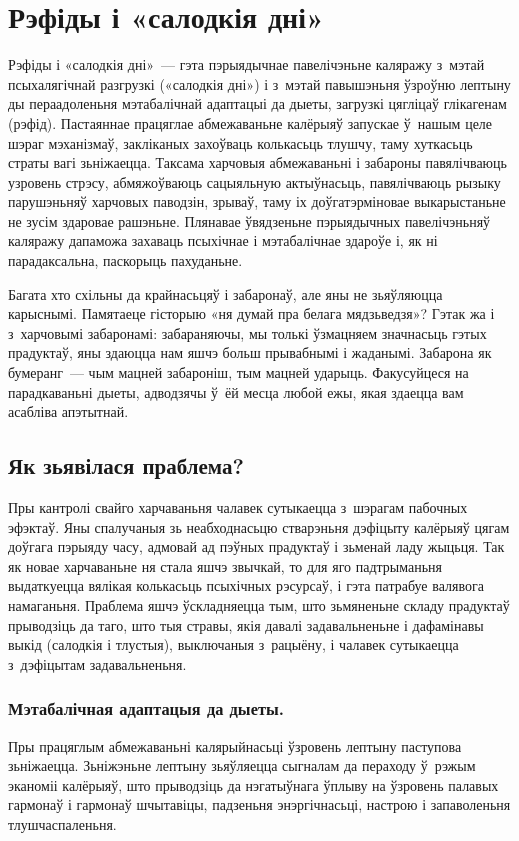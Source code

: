 \chapter{Рэфіды і «салодкія дні»}

Рэфіды і «салодкія дні»~--- гэта пэрыядычнае павелічэньне каляражу з~мэтай псыхалягічнай разгрузкі («салодкія дні») і з~мэтай павышэньня ўзроўню лептыну ды пераадоленьня мэтабалічнай адаптацыі да дыеты, загрузкі цягліцаў глікагенам (рэфід). Пастаяннае працяглае абмежаваньне калёрыяў запускае ў~нашым целе шэраг мэханізмаў, закліканых захоўваць колькасьць тлушчу, таму хуткасьць страты вагі зьніжаецца. Таксама харчовыя абмежаваньні і забароны павялічваюць узровень стрэсу, абмяжоўваюць сацыяльную актыўнасьць, павялічваюць рызыку парушэньняў харчовых паводзін, зрываў, таму іх доўгатэрміновае выкарыстаньне не зусім здаровае рашэньне. Плянавае ўвядзеньне пэрыядычных павелічэньняў каляражу дапаможа захаваць псыхічнае і мэтабалічнае здароўе і, як ні парадаксальна, паскорыць пахуданьне.

Багата хто схільны да крайнасьцяў і забаронаў, але яны не зьяўляюцца карыснымі. Памятаеце гісторыю «ня думай пра белага мядзьведзя»? Гэтак жа і з~харчовымі забаронамі: забараняючы, мы толькі ўзмацняем значнасьць гэтых прадуктаў, яны здаюцца нам яшчэ больш прывабнымі і жаданымі. Забарона як бумеранг~--- чым мацней забароніш, тым мацней ударыць. Факусуйцеся на парадкаваньні дыеты, адводзячы ў~ёй месца любой ежы, якая здаецца вам асабліва апэтытнай.

\section{Як зьявілася праблема?}

Пры кантролі свайго харчаваньня чалавек сутыкаецца з~шэрагам пабочных эфэктаў. Яны спалучаныя зь неабходнасьцю стварэньня дэфіцыту калёрыяў цягам доўгага пэрыяду часу, адмовай ад пэўных прадуктаў і зьменай ладу жыцьця. Так як новае харчаваньне ня стала яшчэ звычкай, то для яго падтрыманьня выдаткуецца вялікая колькасьць псыхічных рэсурсаў, і гэта патрабуе валявога намаганьня. Праблема яшчэ ўскладняецца тым, што зьмяненьне складу прадуктаў прыводзіць да таго, што тыя стравы, якія давалі задавальненьне і дафамінавы выкід (салодкія і тлустыя), выключаныя з~рацыёну, і чалавек сутыкаецца з~дэфіцытам задавальненьня.

\subsection{Мэтабалічная адаптацыя да дыеты.}
Пры працяглым абмежаваньні калярыйнасьці ўзровень лептыну паступова зьніжаецца. Зьніжэньне лептыну зьяўляецца сыгналам да пераходу ў~рэжым эканоміі калёрыяў, што прыводзіць да нэгатыўнага ўплыву на ўзровень палавых гармонаў і гармонаў шчытавіцы, падзеньня энэргічнасьці, настрою і запаволеньня тлушчаспаленьня.

